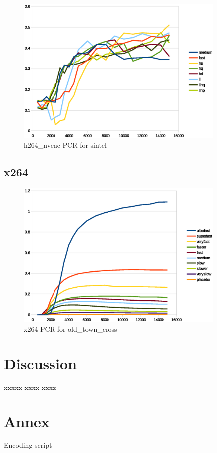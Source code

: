 \documentclass[12pt,twoside]{article}
\begin{document}
\begin{figure}[!h]
	\vspace{-10pt}
	\centering
	\includegraphics[width=0.9\textwidth]{img/h264_nvencSintelPCR.eps}
	\caption{h264\_nvenc PCR for sintel}
	\label{fig:h264_nvencSintelPCR}
\end{figure}
\subsection{x264}
\begin{figure}[!h]
	\vspace{-10pt}
	\centering
	\includegraphics[width=0.9\textwidth]{img/x264oldtTownCrossPCR.eps}
	\caption{x264 PCR for old\_town\_cross}
	\label{fig:x264oldtTownCrossPCR}
\end{figure}
\newpage
\section{Discussion}
\label{sec:discussion}
xxxxx xxxx xxxx 
\newpage
\printbibliography
\appendix
\section{Annex}
%
Encoding script

\end{document}
